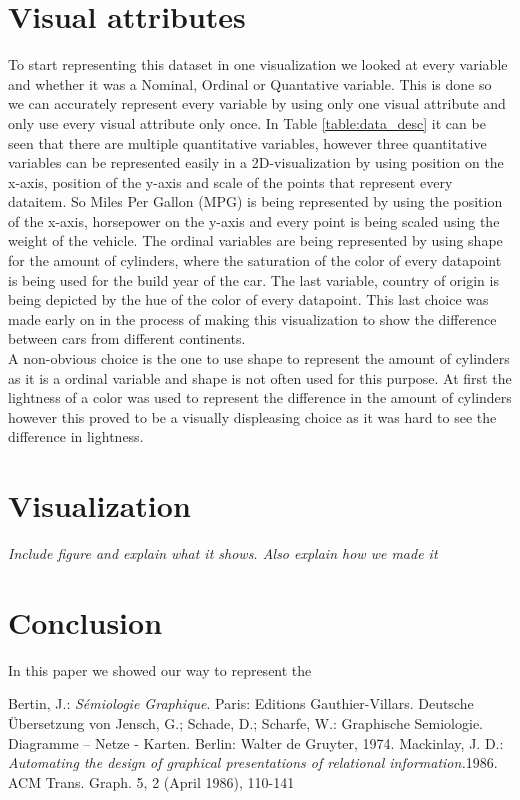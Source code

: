 \documentclass{article}
\begin{document}
\section{Visual attributes}
To start representing this dataset in one visualization we looked at every variable and whether it was a Nominal, Ordinal or Quantative variable. This is done so we can accurately represent every variable by using only one visual attribute and only use every visual attribute only once. In Table \ref{table:data_desc} it can be seen that there are multiple quantitative variables, however three quantitative variables can be represented easily in a 2D-visualization by using position on the x-axis, position of the y-axis and scale of the points that represent every dataitem. So Miles Per Gallon (MPG) is being represented by using the position of the x-axis, horsepower on the y-axis and every point is being scaled using the weight of the vehicle. The ordinal variables are being represented by using shape for the amount of cylinders, where the saturation of the color of every datapoint is being used for the build year of the car. The last variable, country of origin is being depicted by the hue of the color of every datapoint. This last choice was made early on in the process of making this visualization to show the difference between cars from different continents.\\
A non-obvious choice is the one to use shape to represent the amount of cylinders as it is a ordinal variable and shape is not often used for this purpose. At first the lightness of a color was used to represent the difference in the amount of cylinders however this proved to be a visually displeasing choice as it was hard to see the difference in lightness.

\section{Visualization}
\textit{Include figure and explain what it shows. Also explain how we made it}

\section{Conclusion}
In this paper we showed our way to represent the 


\begin{thebibliography}{99}
Bertin, J.: \emph{Sémiologie Graphique}. Paris: Editions Gauthier-Villars. Deutsche Übersetzung von Jensch, G.; Schade, D.; Scharfe, W.: Graphische Semiologie. Diagramme – Netze - Karten. Berlin: Walter de Gruyter, 1974.
Mackinlay, J. D.: \emph{Automating the design of graphical presentations of relational information.}1986. ACM Trans. Graph. 5, 2 (April 1986), 110-141
\end{thebibliography}
\end{document}
